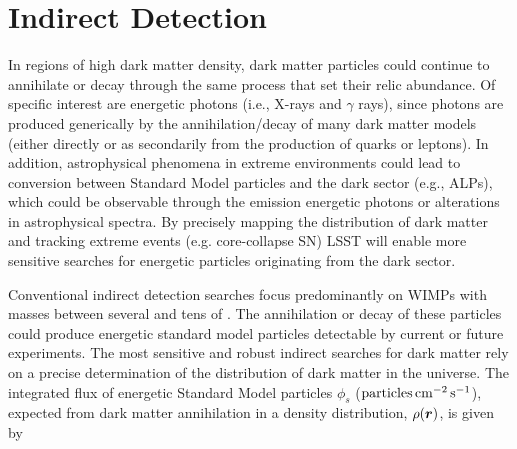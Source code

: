 \section{Indirect Detection }

In regions of high dark matter density, dark matter particles could continue to annihilate or decay through the same process that set their relic abundance.
Of specific interest are energetic photons (i.e., X-rays and $\gamma$ rays), since photons are produced generically by the annihilation/decay of many dark matter models (either directly or as secondarily from the production of quarks or leptons). In addition, astrophysical phenomena in extreme environments could lead to conversion between Standard Model particles and the dark sector (e.g., ALPs), which could be observable through the emission energetic photons or alterations in astrophysical spectra.
By precisely mapping the distribution of dark matter and tracking extreme events (e.g. core-collapse SN) LSST will enable more sensitive searches for energetic particles originating from the dark sector.

Conventional indirect detection searches focus predominantly on WIMPs with masses between several \GeV and tens of \TeV. 
The annihilation or decay of these particles could produce energetic standard model particles detectable by current or future experiments.
The most sensitive and robust indirect searches for dark matter rely on a precise determination of the distribution of dark matter in the universe.
The integrated flux of energetic Standard Model particles $\phi_s$ (${\rm particles} \mathrm{\,cm}^{-2} \mathrm{\,s}^{-1}$), expected from dark matter annihilation in a density distribution, $\rho(\boldsymbol{r})$, is given by

